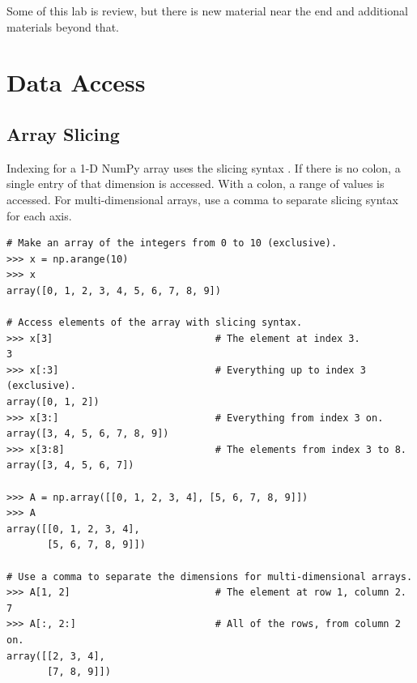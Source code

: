 \label{lab:AdvancedNumpy}

\labdependencies{}

\begin{info}
Some of this lab is review, but there is new material near the end and additional materials beyond that.
\end{info}

\section*{Data Access} %

\subsection*{Array Slicing} %

Indexing for a 1-D NumPy array uses the slicing syntax .
If there is no colon, a single entry of that dimension is accessed.
With a colon, a range of values is accessed.
For multi-dimensional arrays, use a comma to separate slicing syntax for each axis.

\begin{lstlisting}
# Make an array of the integers from 0 to 10 (exclusive).
>>> x = np.arange(10)
>>> x
array([0, 1, 2, 3, 4, 5, 6, 7, 8, 9])

# Access elements of the array with slicing syntax.
>>> x[3]                            # The element at index 3.
3
>>> x[:3]                           # Everything up to index 3 (exclusive).
array([0, 1, 2])
>>> x[3:]                           # Everything from index 3 on.
array([3, 4, 5, 6, 7, 8, 9])
>>> x[3:8]                          # The elements from index 3 to 8.
array([3, 4, 5, 6, 7])

>>> A = np.array([[0, 1, 2, 3, 4], [5, 6, 7, 8, 9]])
>>> A
array([[0, 1, 2, 3, 4],
       [5, 6, 7, 8, 9]])

# Use a comma to separate the dimensions for multi-dimensional arrays.
>>> A[1, 2]                         # The element at row 1, column 2.
7
>>> A[:, 2:]                        # All of the rows, from column 2 on.
array([[2, 3, 4],
       [7, 8, 9]])
\end{lstlisting}

